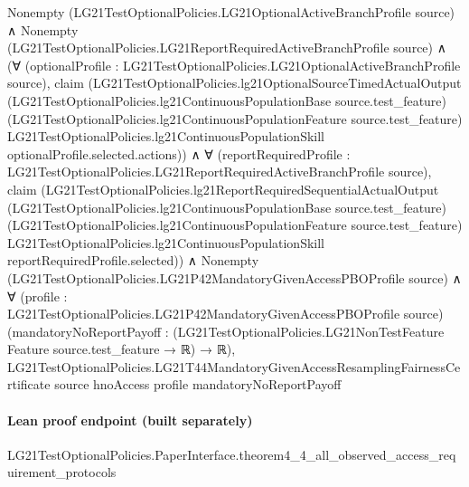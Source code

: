 \documentclass[10pt]{article}
\begin{document}
\begin{ReviewVerbatim}
  Nonempty (LG21TestOptionalPolicies.LG21OptionalActiveBranchProfile source) ∧
    Nonempty (LG21TestOptionalPolicies.LG21ReportRequiredActiveBranchProfile source) ∧
      (∀ (optionalProfile : LG21TestOptionalPolicies.LG21OptionalActiveBranchProfile source),
          claim
            (LG21TestOptionalPolicies.lg21OptionalSourceTimedActualOutput
              (LG21TestOptionalPolicies.lg21ContinuousPopulationBase source.test_feature)
              (LG21TestOptionalPolicies.lg21ContinuousPopulationFeature source.test_feature)
              LG21TestOptionalPolicies.lg21ContinuousPopulationSkill optionalProfile.selected.actions)) ∧
        ∀ (reportRequiredProfile : LG21TestOptionalPolicies.LG21ReportRequiredActiveBranchProfile source),
          claim
            (LG21TestOptionalPolicies.lg21ReportRequiredSequentialActualOutput
              (LG21TestOptionalPolicies.lg21ContinuousPopulationBase source.test_feature)
              (LG21TestOptionalPolicies.lg21ContinuousPopulationFeature source.test_feature)
              LG21TestOptionalPolicies.lg21ContinuousPopulationSkill reportRequiredProfile.selected)) ∧
  Nonempty (LG21TestOptionalPolicies.LG21P42MandatoryGivenAccessPBOProfile source) ∧
    ∀ (profile : LG21TestOptionalPolicies.LG21P42MandatoryGivenAccessPBOProfile source)
      (mandatoryNoReportPayoff : (LG21TestOptionalPolicies.LG21NonTestFeature Feature source.test_feature → ℝ) → ℝ),
      LG21TestOptionalPolicies.LG21T44MandatoryGivenAccessResamplingFairnessCertificate source hnoAccess profile
        mandatoryNoReportPayoff
\end{ReviewVerbatim}

\paragraph{Lean proof endpoint (built separately)}\begin{ReviewVerbatim}
LG21TestOptionalPolicies.PaperInterface.theorem4_4_all_observed_access_requirement_protocols
\end{ReviewVerbatim}
\end{document}
